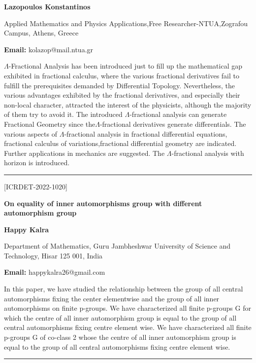 \documentclass[twoside,11pt]{amsart}
\begin{document}
\centerline{\textbf{Lazopoulos Konstantinos
}}
\vskip 2mm
\begin{flushleft}

Applied Mathematics and Physics Applications,Free Researcher-NTUA,Zografou Campus, Athens, Greece
\vskip 2mm
\end{flushleft}
\vskip 2mm
\begin{flushleft}
{\bf Email:} kolazop@mail.ntua.gr
\end{flushleft}
\vskip 5mm
 $\Lambda$-Fractional Analysis has been introduced just to fill up the mathematical gap exhibited in fractional calculus, where the various fractional derivatives fail to fulfill the prerequisites demanded by Differential Topology. Nevertheless, the various advantages exhibited by the fractional derivatives, and especially their non-local character, attracted the interest of the physicists, although the majority of them try to avoid it.
 \vskip 2mm
  \newpage
  The introduced $\Lambda$-fractional analysis can generate Fractional Geometry since the$\Lambda$-fractional derivatives generate differentials. The various aspects of $\Lambda$-fractional analysis in fractional differential equations, fractional calculus of variations,fractional differential geometry are indicated. Further applications in mechanics are suggested. The $\Lambda$-fractional analysis with horizon is introduced.
  \vskip 2mm
\rule{\textwidth}{0.5pt}

\vskip 5mm
\begin{flushleft}
\centerline{[ICRDET-2022-1020]}
\end{flushleft}
\begin{center}\bf\LARGE
On equality of  inner automorphisms group with different automorphism group


\end{center}
\vskip 5mm

\centerline{\textbf{Happy Kalra  }}
\vskip 5mm
\begin{flushleft}
Department of Mathematics,
Guru Jambheshwar University of Science and Technology, Hisar 125 001, India
\vskip 5mm
\end{flushleft}
\vskip 2mm
\begin{flushleft}
{\bf Email:}  happykalra26@gmail.com
\end{flushleft}
\vskip 5mm
In this paper, we have studied the relationship between the group of all central automorphisms fixing the center elementwise and the group of all inner automorphisms on  finite p-groups. We have characterized all finite p-groups G for which the centre of all inner automorphism group is equal to the group of all central automorphisms fixing centre element wise. We have characterized  all finite p-groups G of co-class 2 whose the centre of all inner automorphism group is equal to the group of all central automorphisms fixing centre element wise.
\vskip 2mm
\rule{\textwidth}{0.5pt}
\end{document}
